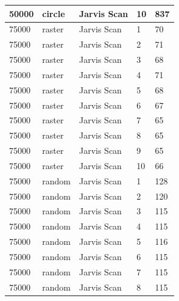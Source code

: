 \documentclass[12pt]{article}
\begin{document}
\begin{longtable}{|l|l|l|l|l|}
50000        & circle            & Jarvis Scan & 10         & 837                           \\ \hline
75000        & raster            & Jarvis Scan & 1          & 70                            \\ \hline
75000        & raster            & Jarvis Scan & 2          & 71                            \\ \hline
75000        & raster            & Jarvis Scan & 3          & 68                            \\ \hline
75000        & raster            & Jarvis Scan & 4          & 71                            \\ \hline
75000        & raster            & Jarvis Scan & 5          & 68                            \\ \hline
75000        & raster            & Jarvis Scan & 6          & 67                            \\ \hline
75000        & raster            & Jarvis Scan & 7          & 65                            \\ \hline
75000        & raster            & Jarvis Scan & 8          & 65                            \\ \hline
75000        & raster            & Jarvis Scan & 9          & 65                            \\ \hline
75000        & raster            & Jarvis Scan & 10         & 66                            \\ \hline
75000        & random            & Jarvis Scan & 1          & 128                           \\ \hline
75000        & random            & Jarvis Scan & 2          & 120                           \\ \hline
75000        & random            & Jarvis Scan & 3          & 115                           \\ \hline
75000        & random            & Jarvis Scan & 4          & 115                           \\ \hline
75000        & random            & Jarvis Scan & 5          & 116                           \\ \hline
75000        & random            & Jarvis Scan & 6          & 115                           \\ \hline
75000        & random            & Jarvis Scan & 7          & 115                           \\ \hline
75000        & random            & Jarvis Scan & 8          & 115                           \\ \hline

\end{longtable}
\end{document}
